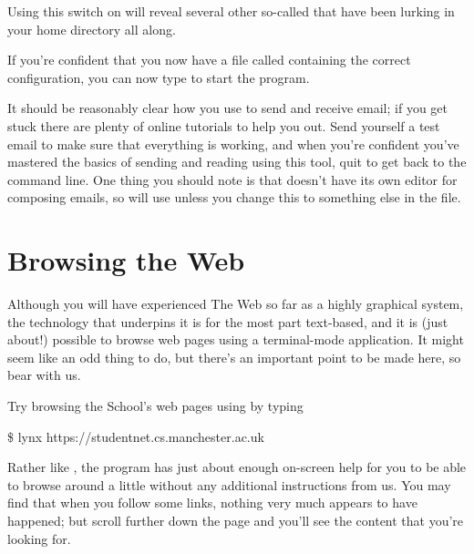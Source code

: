 Using this switch on  will reveal several other so-called  that have been lurking in your home directory all along.

If you're confident that you now have a file called  containing the correct configuration, you can now type  to start the program.

It should be reasonably clear how you use  to send and receive email; if you get stuck there are plenty of online tutorials to help you out. Send yourself a test email to make sure that everything is working, and when you're confident you've mastered the basics of sending and reading using this tool, quit  to get back to the command line. One thing you should note is that  doesn't have its own editor for composing emails, so will use  unless you change this to something else in the  file.

\section{Browsing the Web}

Although you will have experienced The Web so far as a highly graphical system, the technology that underpins it is for the most part text-based, and it is (just about!) possible to browse web pages using a terminal-mode application. It might seem like an odd thing to do, but there's an important point to be made here, so bear with us.



Try browsing the School's web pages using  by typing

\begin{ttoutenv}
\$ lynx https://studentnet.cs.manchester.ac.uk
\end{ttoutenv}

Rather like , the  program has just about enough on-screen help for you to be able to browse around a little without any additional instructions from us.  You may find that when you follow some links, nothing very much appears to have happened; but scroll further down the page and you'll see the content that you're looking for.

